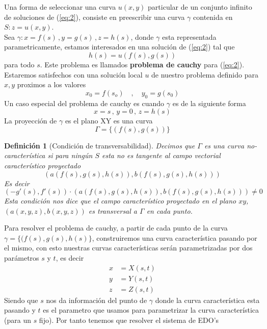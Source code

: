 \documentclass{article}
\newtheorem{definition}{Definición}
\begin{document}
Una forma de seleccionar una curva $u(x,y)$ particular de un conjunto infinito de soluciones de (\ref{eq:2}), consiste en preescribir una curva $\gamma$ contenida en $S: z=u(x,y)$.\\
Sea $\gamma:x=f(s)\,, y=g(s)\,, z=h(s)$, donde $\gamma$ esta representada parametricamente, estamos interesados en una solución de (\ref{eq:2}) tal que 
\begin{equation*}
    h(s)=u(f(s),g(s))
\end{equation*}
para todo $s$. Este problema es llamados \textbf{problema de cauchy} para (\ref{eq:2}). Estaremos satisfechos con una solución local $u$ de nuestro problema definido para $x,y$ proximos a los valores
\begin{equation*}
    x_0=f(s_o)\quad,\quad y_0=g(s_0)
\end{equation*}
Un caso especial del problema de cauchy es cuando $\gamma$ es de la siguiente forma
\begin{equation*}
    x=s\, ,\, y=0\, ,\, z=h(s)
\end{equation*}
La proyección de $\gamma$ es el plano XY es una curva
\begin{equation*}
    \Gamma =\{(f(s),g(s))\}
\end{equation*}
\begin{definition}[Condición de transversabilidad]
    Decimos que $\Gamma$ es una curva no-característica si para ningún $S$ esta no es tangente al campo vectorial característico proyectado
    \begin{equation*}
        (a(f(s),g(s),h(s)),b(f(s),g(s),h(s)))
    \end{equation*}
    Es decir
    \begin{equation*}
        (-g'(s),f'(s))\cdot(a(f(s),g(s),h(s)),b(f(s),g(s),h(s)))\neq 0
    \end{equation*}
    Esta condición nos dice que el campo característico proyectado en el plano $xy$, $(a(x,y,z),b(x,y,z))$ es transversal a $\Gamma$ en cada punto.
\end{definition}
Para resolver el problema de cauchy, a partir de cada punto de la curva $\gamma=\{(f(s),g(s),h(s)\}$, construiremos una curva característica pasando por el mismo, con esto nuestras curvas características serán parametrizadas por dos parámetros $s$ y $t$, es decir
\begin{align*}
    x&=X(s,t)\\
    y&=Y(s,t)\\
    z&=Z(s,t)
\end{align*}
Siendo que $s$ nos da información del punto de $\gamma$ donde la curva característica esta pasando y $t$ es el parametro que usamos para parametrizar la curva característica (para un $s$ fijo). Por tanto tenemos que resolver el sistema de EDO's
\end{document}
